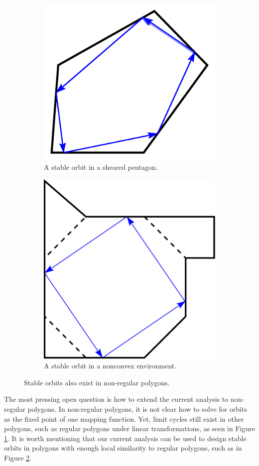 \documentclass[letterpaper, 10 pt, conference]{ieeeconf}  %
\begin{document}
\begin{figure}[t]
\begin{subfigure}{.23\textwidth}
\centering
\includegraphics[width=0.8\linewidth]{../figs/shear.pdf}
\caption{A stable orbit in a sheared pentagon.}
\label{shear}
\end{subfigure}%
\hfill
\begin{subfigure}{0.23\textwidth}
\centering
\includegraphics[width=0.6\linewidth]{../figs/oct.pdf}
\caption{A stable orbit in a nonconvex environment.}
\label{oct}
\end{subfigure}
\caption{Stable orbits also exist in non-regular polygons. }
\label{squish-shear}
\end{figure}

The most pressing open question is how to extend the current analysis to 
non-regular polygons. In non-regular polygons, it is not clear how to 
solve for orbits as the fixed point of one
mapping function. Yet, limit cycles still exist in other polygons, such as
regular polygons under linear transformations, as seen in Figure \ref{shear}.
It is worth mentioning that our current analysis can be used to design stable
orbits in polygons with enough local similarity to regular polygons, such
as in Figure \ref{oct}.
\end{document}
